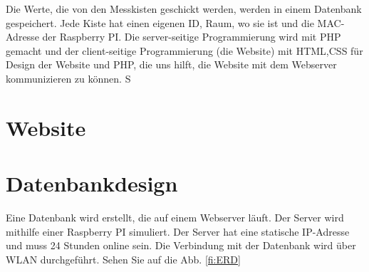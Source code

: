 \pagestyle{fancy}
Die Werte, die von den Messkisten geschickt werden, werden in einem Datenbank gespeichert. Jede Kiste hat einen eigenen ID, Raum, wo sie ist und die MAC-Adresse der Raspberry PI. Die server-seitige Programmierung wird mit PHP gemacht und der client-seitige Programmierung (die Website) mit HTML,CSS f\"ur Design der Website und PHP, die uns hilft, die Website mit dem Webserver kommunizieren zu k\"onnen. S
	\section{Website}
	\section{Datenbankdesign}
	Eine Datenbank wird erstellt, die auf einem Webserver l\"auft. Der Server wird mithilfe einer Raspberry PI simuliert. Der Server hat eine statische IP-Adresse und muss 24 Stunden online sein. Die Verbindung mit der Datenbank wird \"uber WLAN durchgef\"uhrt. Sehen Sie auf die Abb. \ref{fi:ERD}
